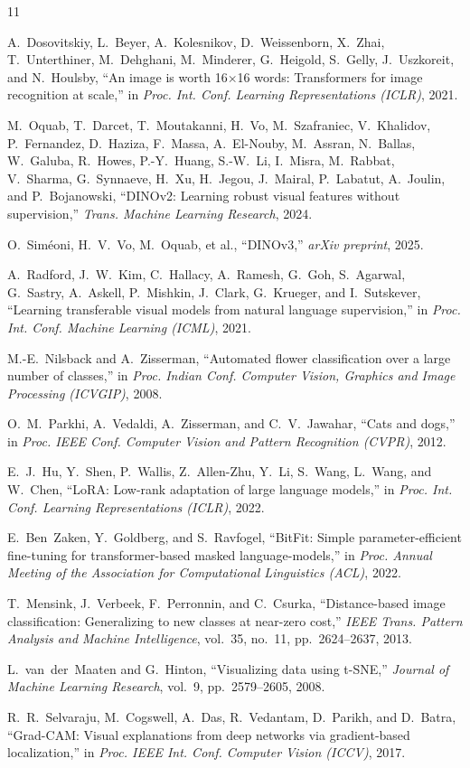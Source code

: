 \documentclass[journal,11pt]{IEEEtran}
\begin{document}
\begin{thebibliography}{11}

A.~Dosovitskiy, L.~Beyer, A.~Kolesnikov, D.~Weissenborn, X.~Zhai, T.~Unterthiner, M.~Dehghani, M.~Minderer, G.~Heigold, S.~Gelly, J.~Uszkoreit, and N.~Houlsby, ``An image is worth 16$\times$16 words: Transformers for image recognition at scale,'' in \emph{Proc. Int. Conf. Learning Representations (ICLR)}, 2021.

M.~Oquab, T.~Darcet, T.~Moutakanni, H.~Vo, M.~Szafraniec, V.~Khalidov, P.~Fernandez, D.~Haziza, F.~Massa, A.~El-Nouby, M.~Assran, N.~Ballas, W.~Galuba, R.~Howes, P.-Y.~Huang, S.-W.~Li, I.~Misra, M.~Rabbat, V.~Sharma, G.~Synnaeve, H.~Xu, H.~Jegou, J.~Mairal, P.~Labatut, A.~Joulin, and P.~Bojanowski, ``DINOv2: Learning robust visual features without supervision,'' \emph{Trans. Machine Learning Research}, 2024.

O.~Sim\'eoni, H.~V.~Vo, M.~Oquab, et al., ``DINOv3,'' \emph{arXiv preprint}, 2025.

A.~Radford, J.~W.~Kim, C.~Hallacy, A.~Ramesh, G.~Goh, S.~Agarwal, G.~Sastry, A.~Askell, P.~Mishkin, J.~Clark, G.~Krueger, and I.~Sutskever, ``Learning transferable visual models from natural language supervision,'' in \emph{Proc. Int. Conf. Machine Learning (ICML)}, 2021.

M.-E.~Nilsback and A.~Zisserman, ``Automated flower classification over a large number of classes,'' in \emph{Proc. Indian Conf. Computer Vision, Graphics and Image Processing (ICVGIP)}, 2008.

O.~M.~Parkhi, A.~Vedaldi, A.~Zisserman, and C.~V.~Jawahar, ``Cats and dogs,'' in \emph{Proc. IEEE Conf. Computer Vision and Pattern Recognition (CVPR)}, 2012.

E.~J.~Hu, Y.~Shen, P.~Wallis, Z.~Allen-Zhu, Y.~Li, S.~Wang, L.~Wang, and W.~Chen, ``LoRA: Low-rank adaptation of large language models,'' in \emph{Proc. Int. Conf. Learning Representations (ICLR)}, 2022.

E.~Ben~Zaken, Y.~Goldberg, and S.~Ravfogel, ``BitFit: Simple parameter-efficient fine-tuning for transformer-based masked language-models,'' in \emph{Proc. Annual Meeting of the Association for Computational Linguistics (ACL)}, 2022.

T.~Mensink, J.~Verbeek, F.~Perronnin, and C.~Csurka, ``Distance-based image classification: Generalizing to new classes at near-zero cost,'' \emph{IEEE Trans. Pattern Analysis and Machine Intelligence}, vol.~35, no.~11, pp.~2624--2637, 2013.

L.~van~der~Maaten and G.~Hinton, ``Visualizing data using t-SNE,'' \emph{Journal of Machine Learning Research}, vol.~9, pp.~2579--2605, 2008.

R.~R.~Selvaraju, M.~Cogswell, A.~Das, R.~Vedantam, D.~Parikh, and D.~Batra, ``Grad-CAM: Visual explanations from deep networks via gradient-based localization,'' in \emph{Proc. IEEE Int. Conf. Computer Vision (ICCV)}, 2017.

\end{thebibliography}
\end{document}
